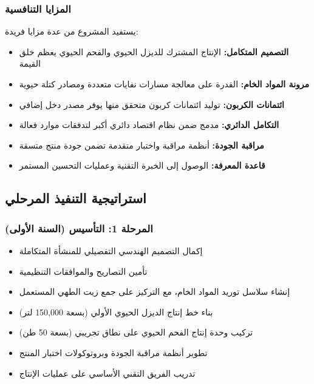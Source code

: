 \subsubsection{المزايا التنافسية}
يستفيد المشروع من عدة مزايا فريدة:

\begin{itemize}
    \item \textbf{التصميم المتكامل:} الإنتاج المشترك للديزل الحيوي والفحم الحيوي يعظم خلق القيمة
    \item \textbf{مرونة المواد الخام:} القدرة على معالجة مسارات نفايات متعددة ومصادر كتلة حيوية
    \item \textbf{ائتمانات الكربون:} توليد ائتمانات كربون متحقق منها يوفر مصدر دخل إضافي
    \item \textbf{التكامل الدائري:} مدمج ضمن نظام اقتصاد دائري أكبر لتدفقات موارد فعالة
    \item \textbf{مراقبة الجودة:} أنظمة مراقبة واختبار متقدمة تضمن جودة منتج متسقة
    \item \textbf{قاعدة المعرفة:} الوصول إلى الخبرة التقنية وعمليات التحسين المستمر
\end{itemize}

\subsection{استراتيجية التنفيذ المرحلي}

\subsubsection{المرحلة 1: التأسيس (السنة الأولى)}
\begin{itemize}
    \item إكمال التصميم الهندسي التفصيلي للمنشأة المتكاملة
    \item تأمين التصاريح والموافقات التنظيمية
    \item إنشاء سلاسل توريد المواد الخام، مع التركيز على جمع زيت الطهي المستعمل
    \item بناء خط إنتاج الديزل الحيوي الأولي (بسعة 150,000 لتر)
    \item تركيب وحدة إنتاج الفحم الحيوي على نطاق تجريبي (بسعة 50 طن)
    \item تطوير أنظمة مراقبة الجودة وبروتوكولات اختبار المنتج
    \item تدريب الفريق التقني الأساسي على عمليات الإنتاج
\end{itemize}

